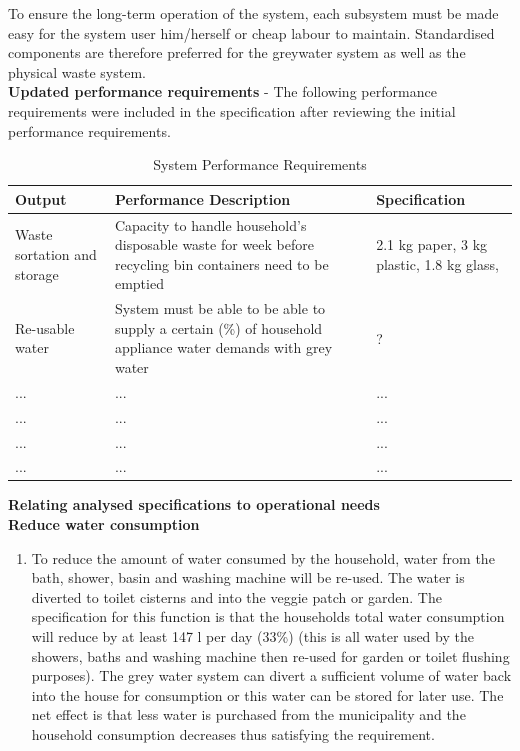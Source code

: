 \documentclass[a4paper,11pt,fleqn]{report}
\begin{document}
To ensure the long-term operation of the system, each subsystem must be made easy for the system user him/herself or cheap labour to maintain. Standardised components are therefore preferred for the greywater system as well as the physical waste system. \\

\noindent\textbf{Updated performance requirements} -
The following performance requirements were included in the specification after reviewing the initial performance requirements.\\

\begin{table}[h!]
\caption {System Performance Requirements} \label{tb: Functional_SS_elements} 
\begin{center}
\begin{tabular}{p{3cm}|p{6cm}|p{5.5cm}}\toprule
	{\textbf{Output}} & {\textbf{Performance Description}} & {\textbf{Specification}}\\ \midrule
    \hline
   Waste sortation and storage & Capacity to handle household's disposable waste for week before recycling bin containers need to be emptied  & 2.1 kg paper, 3 kg plastic, 1.8 kg glass, \citep{Sithole2014}\\
        \hline
    Re-usable water & System must be able to be able to supply a certain (\%) of household appliance water demands with grey water & ?\\
        \hline
    ... & ... & ...\\
        \hline
    ... & ... & ...\\
        \hline
    ... & ... & ...\\
        \hline
    ... & ... & ...\\

    \bottomrule
\end{tabular}
\end{center}
\end{table}

\noindent\textbf{Relating analysed specifications to operational needs}\\

\noindent\textbf{Reduce water consumption}
\begin{enumerate}
\item To reduce the amount of water consumed by the household, water from the bath, shower, basin and washing machine will be re-used. The water is diverted to toilet cisterns and into the veggie patch or garden. The specification for this function is that the households total water consumption will reduce by at least 147 l per day (33\%) (this is all water used by the showers, baths and washing machine then re-used for garden or toilet flushing purposes). The grey water system can divert a sufficient volume of water back into the house for consumption or this water can be stored for later use. The net effect is that less water is purchased from the municipality and the household consumption decreases thus satisfying the requirement.
\end{enumerate}
\end{document}

